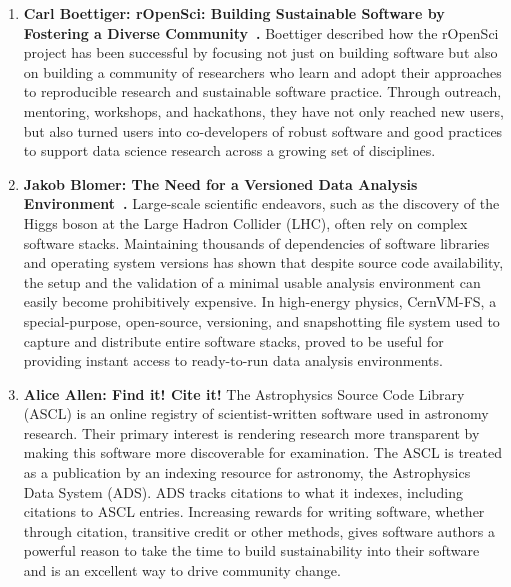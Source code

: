\documentclass[11pt, oneside]{amsart}
\newcommand{\todo}[1]{{\color{blue}$\blacksquare$~\textsf{[TODO: #1]}}}
\begin{document}
\begin{enumerate}
\item \textbf{Carl Boettiger: rOpenSci: Building Sustainable Software by Fostering a
Diverse Community~\cite{Boettiger_poster}.}
Boettiger described how the rOpenSci project has been successful by focusing not
just on building software but also on building a community of researchers who
learn and adopt their approaches to reproducible research and sustainable
software practice. Through outreach, mentoring, workshops, and hackathons, they
have not only reached new users, but also turned users into co-developers of
robust software and good practices to support data science research across a
growing set of disciplines.

\item \textbf{Jakob Blomer: The Need for a Versioned Data Analysis Environment~\cite{Blomer_poster}.}
Large-scale scientific endeavors, such as the discovery of the Higgs boson at
the Large Hadron Collider (LHC), often rely on complex software stacks.
Maintaining thousands of dependencies of software libraries and operating system
versions has shown that despite source code availability, the setup and the
validation of a minimal usable analysis environment can easily become
prohibitively expensive. In high-energy physics, CernVM-FS, a special-purpose, open-source,
versioning, and snapshotting file system used to capture and
distribute entire software stacks, proved to be useful for providing instant access to ready-to-run data
analysis environments.

\item \textbf{Alice Allen: Find it! Cite it! }%
The Astrophysics Source Code Library (ASCL) is an online registry of
scientist-written software used in astronomy research. Their primary interest is
rendering research more transparent by making this software more discoverable for
examination. The ASCL is treated as a publication by an indexing resource for
astronomy, the Astrophysics Data System (ADS). ADS tracks citations to what it
indexes, including citations to ASCL entries. Increasing rewards for writing
software, whether through citation, transitive credit or other methods, gives
software authors a powerful reason to take the time to build sustainability into
their software and is an excellent way to drive community change.
\begin{comment}
The ASCL actively looks for opportunities to use change management strategies to
move astronomy to a more transparent discipline; these strategies can be used in
other disciplines to further change in them.
\end{comment}
\end{enumerate}
\end{document}
